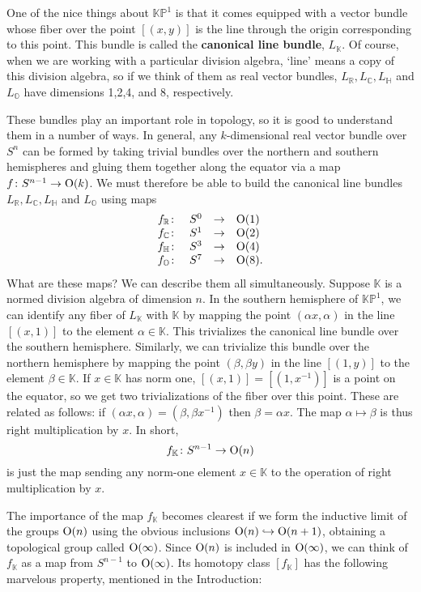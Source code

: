 \documentclass[12pt]{article}
\newcommand\R{{\mathbb R}}
\newcommand\C{{\mathbb C}}
\renewcommand\H{{\mathbb H}}
\newcommand\K{{\mathbb K}}
\renewcommand\O{{\mathbb O}}
\newcommand\KP{{\mathbb {KP}}}
\newcommand{\OO}{{\rm O}}
\newcommand{\maps}{\colon}
\begin{document}
One of the nice things about $\KP^1$ is that it comes equipped with a 
vector bundle whose fiber over the point $[(x,y)]$ is the line 
through the origin corresponding to this point.  This bundle is called 
the {\bf canonical line bundle}, $L_\K$.  Of course, when we are working 
with a particular division algebra, `line' means a copy of this division 
algebra, so if we think of them as real vector bundles, $L_\R, L_\C, 
L_\H$ and $L_\O$ have dimensions 1,2,4, and 8, respectively.   

These bundles play an important role in topology, so it is good to
understand them in a number of ways.  In general, any $k$-dimensional
real vector bundle over $S^n$ can be formed by taking trivial bundles
over the northern and southern hemispheres and gluing  them together
along the equator via a map $f \maps S^{n-1} \to \OO(k)$.  We must
therefore be able to build the canonical line bundles $L_\R, L_\C,
L_\H$ and $L_\O$ using maps  
\[  
\begin{array}{cccl}       
          f_\R \maps &S^0& \to & \OO(1)   \\  
          f_\C \maps &S^1& \to & \OO(2)   \\  
          f_\H \maps &S^3& \to & \OO(4)   \\  
          f_\O \maps &S^7& \to & \OO(8).        
\end{array}   
\]  
What are these maps?  We can describe them all simultaneously.  Suppose  
$\K$ is a normed division algebra of dimension $n$.  In the southern  
hemisphere of $\KP^1$, we can identify any fiber of $L_\K$  with $\K$ by 
mapping the point $(\alpha x, \alpha)$ in the line $[(x,1)]$ to the 
element $\alpha \in \K$.  This trivializes the canonical line bundle 
over the southern hemisphere.  Similarly, we can trivialize this bundle 
over the northern hemisphere by mapping the point $(\beta,\beta y)$ in 
the line $[(1,y)]$ to the element $\beta \in \K$.  If $x \in \K$ has norm 
one, $[(x,1)] = [(1,x^{-1})]$ is a point on the equator, so we get two 
trivializations of the fiber over this point.  These are related as 
follows: if $(\alpha x, \alpha) =  (\beta, \beta x^{-1})$ then $\beta = 
\alpha x$.  The map $\alpha \mapsto \beta$ is thus right multiplication 
by $x$.  In short,   
\[       f_\K \maps S^{n-1} \to \OO(n)  \]  
is just the map sending any norm-one element $x \in \K$ to the operation 
of right multiplication by $x$.   
 
The importance of the map $f_\K$ becomes clearest if we form the 
inductive limit of the groups $\OO(n)$ using the obvious inclusions 
$\OO(n) \hookrightarrow \OO(n+1)$, obtaining a topological group 
called $\OO(\infty)$.  Since $\OO(n)$ is included in $\OO(\infty)$, 
we can think of $f_\K$ as a map from $S^{n-1}$ to $\OO(\infty)$.
Its homotopy class $[f_\K]$ has the following marvelous property,
mentioned in the Introduction:
\end{document}
